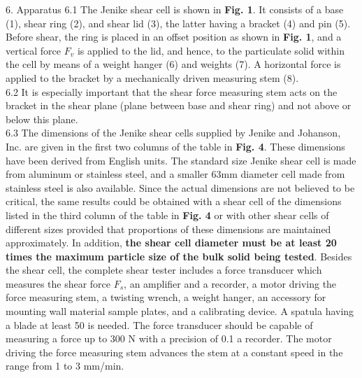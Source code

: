 6. Apparatus
6.1 The Jenike shear cell is shown in \textbf{Fig. 1}. It consists of a base (1), shear ring (2), and shear lid (3), the latter having a bracket (4) and pin (5). Before shear, the ring is placed in an offset position as shown in \textbf{Fig. 1}, and a vertical force $F_v$ is applied to the lid, and hence, to the particulate solid within the cell by means of a weight hanger (6) and weights (7). A horizontal force is applied to the bracket by a mechanically driven measuring stem (8). \\
6.2 It is especially important that the shear force measuring stem acts on the bracket in the shear plane (plane between base and shear ring) and not above or below this plane. \\
6.3 The dimensions of the Jenike shear cells supplied by Jenike and Johanson, Inc. are given in the first two columns of the table in \textbf{Fig. 4}. These dimensions have been derived from English units. The standard size Jenike shear cell is made from aluminum or stainless steel, and a smaller 63mm diameter cell made from stainless steel is also available. Since the actual dimensions are not believed to be critical, the same results could be obtained with a shear cell of the dimensions listed in the third column of the table in \textbf{Fig. 4} or with other shear cells of different sizes provided that proportions of these dimensions are maintained approximately. In addition, \textbf{the shear cell diameter must be at least 20 times the maximum particle size of the bulk solid being tested}. Besides the shear cell, the complete shear tester includes a force transducer which measures the shear force $F_s$, an amplifier and a recorder, a motor driving the force measuring stem, a twisting wrench, a weight hanger, 
an accessory for mounting wall material sample plates, and a calibrating device. A spatula having a blade at least 50 %
is needed. The force  transducer should be capable of measuring a force up to 300 N with a precision of 0.1 %
a recorder. The motor driving the force measuring stem advances the stem at a constant speed in the range from 1 to 3 mm/min. \\

